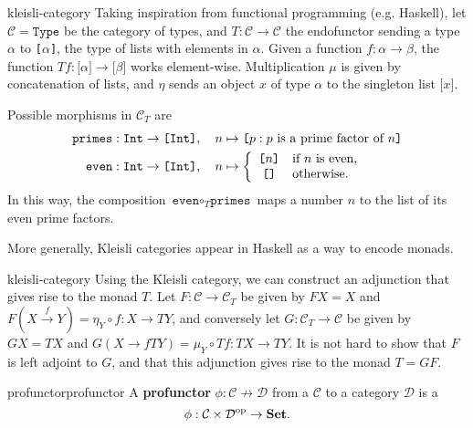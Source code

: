 \begin{example}{kleisli-category}
    Taking inspiration from functional programming (e.g. Haskell), let $\mathcal{C} = \texttt{Type}$ be the category of types, and $T : \mathcal{C} \to \mathcal{C}$ the endofunctor sending a type $\alpha$ to \texttt{[$\alpha$]}, the type of lists with elements in $\alpha$. Given a function $f : \alpha \to \beta$, the function $Tf : \texttt{[}\alpha\texttt{]} \to \texttt{[}\beta\texttt{]}$ works element-wise.
    Multiplication $\mu$ is given by concatenation of lists, and $\eta$ sends an object $x$ of type $\alpha$ to the singleton list $\texttt{[}x\texttt{]}$.
    
    Possible morphisms in $\mathcal{C}_T$ are
    \[ \begin{aligned}
        \texttt{primes} &: \texttt{Int} \to \texttt{[Int]}, \quad n \mapsto \texttt{[}p : p \textup{ is a prime factor of } n\texttt{]} \\
        \texttt{even} &: \texttt{Int} \to \texttt{[Int]}, \quad n \mapsto \left\{ \begin{array}{cl}
         \texttt{[$n$]} & \text{if $n$ is even,} \\
         \texttt{[]} & \text{otherwise.} \end{array} \right.
    \end{aligned} \]
    In this way, the composition $\texttt{even} \circ_T \texttt{primes}$ maps a number $n$ to the list of its even prime factors.
    
    More generally, Kleisli categories appear in Haskell as a way to encode monads.
\end{example}

\begin{example}{kleisli-category}
    Using the Kleisli category, we can construct an adjunction that gives rise to the monad $T$. Let $F : \mathcal{C} \to \mathcal{C}_T$ be given by $FX = X$ and $F(X \xrightarrow{f} Y) = \eta_Y \circ f : X \to TY$, and conversely let $G : \mathcal{C}_T \to \mathcal{C}$ be given by $GX = TX$ and $G(X \rightarrow{f} TY) = \mu_Y \circ Tf : TX \to TY$. It is not hard to show that $F$ is left adjoint to $G$, and that this adjunction gives rise to the monad $T = GF$.
\end{example}

\begin{topic}{profunctor}{profunctor}
    A \textbf{profunctor} $\phi : \mathcal{C} \nrightarrow \mathcal{D}$ from a  $\mathcal{C}$ to a category $\mathcal{D}$ is a 
    \[ \phi : \mathcal{C} \times \mathcal{D}^\textup{op} \to \textbf{Set} . \]
\end{topic}


